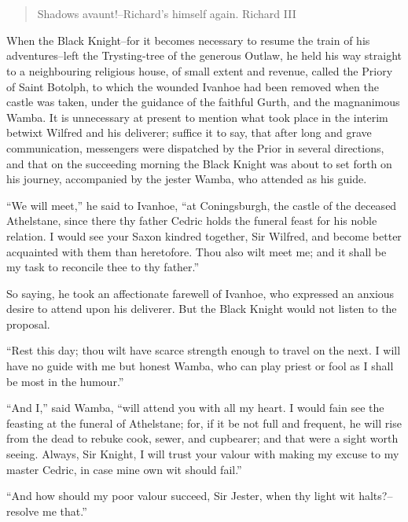 \chapter{}

\begin{quote}
Shadows avaunt!--Richard's himself again.
Richard III
\end{quote}

When the Black Knight--for it becomes necessary to resume the train of
his adventures--left the Trysting-tree of the generous Outlaw, he held
his way straight to a neighbouring religious house, of small extent and
revenue, called the Priory of Saint Botolph, to which the wounded
Ivanhoe had been removed when the castle was taken, under the guidance
of the faithful Gurth, and the magnanimous Wamba. It is unnecessary at
present to mention what took place in the interim betwixt Wilfred and
his deliverer; suffice it to say, that after long and grave
communication, messengers were dispatched by the Prior in several
directions, and that on the succeeding morning the Black Knight was
about to set forth on his journey, accompanied by the jester Wamba, who
attended as his guide.

``We will meet,'' he said to Ivanhoe, ``at Coningsburgh, the castle of
the deceased Athelstane, since there thy father Cedric holds the funeral
feast for his noble relation. I would see your Saxon kindred together,
Sir Wilfred, and become better acquainted with them than heretofore.
Thou also wilt meet me; and it shall be my task to reconcile thee to thy
father.''

So saying, he took an affectionate farewell of Ivanhoe, who expressed an
anxious desire to attend upon his deliverer. But the Black Knight would
not listen to the proposal.

``Rest this day; thou wilt have scarce strength enough to travel on the
next. I will have no guide with me but honest Wamba, who can play priest
or fool as I shall be most in the humour.''

``And I,'' said Wamba, ``will attend you with all my heart. I would fain
see the feasting at the funeral of Athelstane; for, if it be not full
and frequent, he will rise from the dead to rebuke cook, sewer, and
cupbearer; and that were a sight worth seeing. Always, Sir Knight, I
will trust your valour with making my excuse to my master Cedric, in
case mine own wit should fail.''

``And how should my poor valour succeed, Sir Jester, when thy light wit
halts?--resolve me that.''

